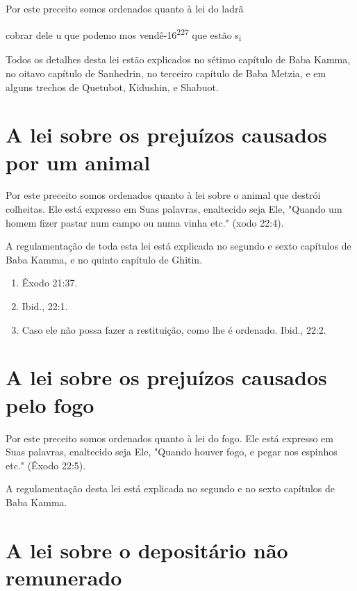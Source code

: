 \begin{itemize}
\begin{enumrate}
\begin{itemize}
\begin{itemize}
\begin{itemize}
Por este preceito somos ordenados quanto à lei do ladrã


cobrar dele u que podemo mos vendê-16\textsuperscript{227} que estão
s\textsubscript{i}

Todos os detalhes desta lei estão explicados no sétimo capítulo de Baba
Kamma, no oitavo capítulo de Sanhedrin, no terceiro capítulo de Baba
Metzia, e em alguns trechos de Quetubot, Kidushin, e Shabuot.

\section{A lei sobre os prejuízos causados por um animal}

Por este preceito somos ordenados quanto à lei sobre o animal que
destrói colheitas. Ele está expresso em Suas palavras, enaltecido seja
Ele, "Quan­do um homem fizer pastar num campo ou numa vinha etc." (xodo
22:4).

A regulamentação de toda esta lei está explicada no segundo e sexto
capítulos de Baba Kamma, e no quinto capítulo de Ghitin.


\begin{enumerate}
\def\labelenumi{\arabic{enumi}.}
\setcounter{enumi}{224}
\item
 
 Êxodo 21:37.
 
\item
 
 Ibid., 22:1.
 
\item
 
 Caso ele não possa fazer a restituição, como lhe é ordenado. Ibid.,
 22:2.
 
\end{enumerate}




\section{A lei sobre os prejuízos causados pelo fogo}

Por este preceito somos ordenados quanto à lei do fogo. Ele está
ex­presso em Suas palavras, enaltecido seja Ele, "Quando houver fogo, e
pegar nos espinhos etc." (Êxodo 22:5).

A regulamentação desta lei está explicada no segundo e no sexto
ca­pítulos de Baba Kamma.

\section{A lei sobre o depositário não remunerado}


\end{itemize}
\end{itemize}
\end{itemize}
\end{enumrate}
\end{itemize}
